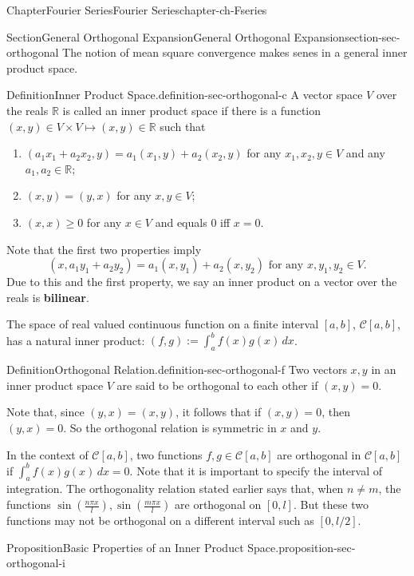 \documentclass[oneside,10pt,]{book}
\newcommand{\terminology}[1]{\textbf{#1}}
\numberwithin{equation}{section}
\newcommand{\bbR}{\mathbb{R}}
\newcommand{\cC}{\mathcal{C}}
\begin{document}
\begin{chapterptx}{Chapter}{Fourier Series}{}{Fourier Series}{}{}{chapter-ch-Fseries}
\begin{sectionptx}{Section}{General Orthogonal Expansion}{}{General Orthogonal Expansion}{}{}{section-sec-orthogonal}
The notion of mean square convergence makes senes in a general inner product space.%
\begin{definition}{Definition}{Inner Product Space.}{definition-sec-orthogonal-c}%
A vector space \(V\) over the reals \(\bbR\) is called an inner product space if there is a function \((x, y)\in V\times V\mapsto (x, y)\in \bbR\) such that%
\begin{enumerate}
\item{}\((a_{1}x_{1}+a_{2}x_{2},y)=a_{1}(x_{1},y)+a_{2}(x_{2}, y)\) for any \(x_{1}, x_{2}, y\in V\) and any \(a_{1}, a_{2}\in \bbR\);%
\item{}\((x, y)=(y, x)\) for any \(x, y\in V\);%
\item{}\((x, x) \ge 0\) for any \(x\in V\) and equals \(0\) iff \(x=0\).%
\end{enumerate}
%
\end{definition}
Note that the first two properties imply%
\begin{equation*}
(x, a_{1}y_{1}+a_{2}y_{2})= a_{1}(x, y_{1})+a_{2}(x, y_{2}) \text{ for  any $x, y_{1}, y_{2}\in V$.}
\end{equation*}
Due to this and the first property, we say an inner product on a vector over the reals is \terminology{bilinear}.%
\par
The space of real  valued continuous function on a finite interval \([a, b]\), \(\cC[a, b]\), has a natural inner product: \((f, g) :=\int_{a}^{b} f(x)g(x)\, dx\).%
\begin{definition}{Definition}{Orthogonal Relation.}{definition-sec-orthogonal-f}%
 Two vectors \(x, y\) in an inner product space \(V\) are said to be orthogonal to each other if \((x, y)=0\).\end{definition}
Note that, since \((y, x)=(x, y)\), it follows that if \((x, y)=0\), then \((y, x)=0\). So the orthogonal relation is symmetric in \(x\) and \(y\).%
\par
In the context of \(\cC[a, b]\), two functions \(f, g\in \cC[a, b]\) are orthogonal in \(\cC[a, b]\) if \(\int_{a}^{b} f(x)g(x)\, dx=0\). Note that it is important to specify the interval of integration. The orthogonality relation  stated earlier says that, when \(n\ne m\), the functions \(\sin \left(\frac{n \pi x}{l}\right), \sin \left(\frac{m \pi x}{l}\right)\) are orthogonal on \([0, l]\).  But these two functions may not be orthogonal on a different interval such as \([0, l/2]\).%
\begin{proposition}{Proposition}{Basic Properties of an Inner Product Space.}{}{proposition-sec-orthogonal-i}%

\end{proposition}
\end{sectionptx}
\end{chapterptx}
\end{document}
